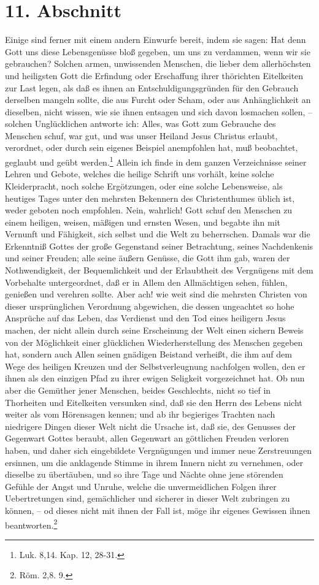 \section{11. Abschnitt}

Einige sind ferner mit einem andern Einwurfe bereit, indem sie sagen: Hat denn Gott uns diese Lebensgenüsse bloß gegeben, um uns zu verdammen, wenn wir sie gebrauchen? Solchen armen, unwissenden Menschen, die lieber dem allerhöchsten und heiligsten Gott die Erfindung oder Erschaffung ihrer thörichten Eitelkeiten zur Last legen, als daß es ihnen an Entschuldigungsgründen für den Gebrauch derselben mangeln sollte, die aus Furcht oder Scham, oder aus Anhänglichkeit an dieselben, nicht wissen, wie sie ihnen entsagen und sich davon losmachen sollen, -- solchen Unglücklichen antworte ich: Alles, was Gott zum Gebrauche des Menschen schuf, war gut, und was unser Heiland Jesus Christus erlaubt, verordnet, oder durch sein eigenes Beispiel anempfohlen hat, muß beobachtet, geglaubt und geübt werden.\footnote{Luk. 8,14. Kap. 12, 28-31.}  Allein ich finde in dem ganzen Verzeichnisse seiner Lehren und Gebote, welches die heilige Schrift uns vorhält, keine solche Kleiderpracht, noch solche Ergötzungen, oder eine solche Lebensweise, als heutiges Tages unter den mehrsten Bekennern des Christenthumes üblich ist, weder geboten noch empfohlen. Nein, wahrlich! Gott schuf den Menschen zu einem heiligen, weisen, mäßigen und ernsten Wesen, und begabte ihn mit Vernunft und Fähigkeit, sich selbst und die Welt zu beherrschen. Damals war die Erkenntniß Gottes der große Gegenstand seiner Betrachtung, seines Nachdenkenis und seiner Freuden; alle seine äußern Genüsse, die Gott ihm gab, waren der Nothwendigkeit, der Bequemlichkeit und der Erlaubtheit des Vergnügens mit dem Vorbehalte untergeordnet, daß er in Allem den Allmächtigen sehen, fühlen, genießen und verehren sollte. Aber ach! wie weit sind die mehrsten Christen von dieser ursprünglichen Verordnung abgewichen, die dessen ungeachtet so hohe Ansprüche auf das Leben, das Verdienst und den Tod eines heiligern Jesus machen, der nicht allein durch seine Erscheinung der Welt einen sichern Beweis von der Möglichkeit einer glücklichen Wiederherstellung des Menschen gegeben hat, sondern auch Allen seinen gnädigen Beistand verheißt, die ihm auf dem Wege des heiligen Kreuzen und der Selbstverleugnung nachfolgen wollen, den er ihnen als den einzigen Pfad zu ihrer ewigen Seligkeit vorgezeichnet hat. Ob nun aber die Gemüther jener Menschen, beides Geschlechts, nicht so tief in Thorheiten und Eitelkeiten versunken sind, daß sie den Herrn des Lebens nicht weiter als vom Hörensagen kennen; und ab ihr begieriges Trachten nach niedrigere Dingen dieser Welt nicht die Ursache ist, daß sie, des Genusses der Gegenwart Gottes beraubt, allen Gegenwart an göttlichen Freuden verloren haben, und daher sich eingebildete Vergnügungen und immer neue Zerstreuungen ersinnen, um die anklagende Stimme in ihrem Innern nicht zu vernehmen, oder dieselbe zu übertäuben, und so ihre Tage und Nächte ohne jene störenden Gefühle der Angst und Unruhe, welche die unvermeidlichen Folgen ihrer Uebertretungen sind, gemächlicher und sicherer in dieser Welt zubringen zu können, -- od dieses nicht mit ihnen der Fall ist, möge ihr eigenes Gewissen ihnen beantworten.\footnote{Röm. 2,8. 9.}

